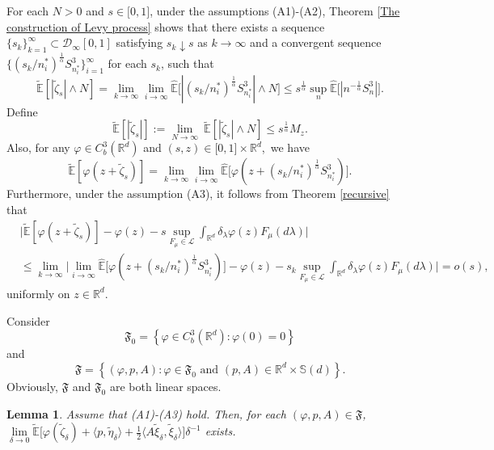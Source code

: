 \documentclass[a4paper,oneside,10pt]{article}%
\newtheorem{lemma}[theorem]{Lemma}
\numberwithin{equation}{section}
\begin{document}
For each $N>0$ and $s\in \lbrack0,1]$, under the assumptions (A1)-(A2), Theorem
\ref{The construction of Levy process} shows that there exists a sequence
$\{s_{k}\}_{k=1}^{\infty}\subset \mathcal{D}_{\infty}[0,1]$ satisfying
$s_{k}\downarrow s$ as $k\rightarrow \infty$ and a convergent sequence
$\big \{(s_{k}/n_{i}^{\ast})^{\frac{1}{\alpha}}S_{n_{i}^{\ast}}^{3}%
\big \}_{i=1}^{\infty}$ for each $s_{k}$, such that
\[
\mathbb{\tilde{E}}[|\tilde{\zeta}_{s}|\wedge N]=\lim_{k\rightarrow \infty}%
\lim_{i\rightarrow \infty}\mathbb{\hat{E}}\big[|(s_{k}/n_{i}^{\ast})^{\frac
{1}{\alpha}}S_{n_{i}^{\ast}}^{3}|\wedge N\big]\leq s^{\frac{1}{\alpha}}%
\sup \limits_{n}\mathbb{\hat{E}}\big[|n^{-\frac{1}{\alpha}}S_{n}^{3}|\big].
\]
Define
\begin{equation}
\mathbb{\tilde{E}}[|\tilde{\zeta}_{s}|]:=\lim_{N\rightarrow \infty
}\mathbb{\  \tilde{E}}[|\tilde{\zeta}_{s}|\wedge N]\leq s^{\frac{1}{\alpha}%
}M_{z}. \label{Z moment}%
\end{equation}
Also, for any $\varphi \in C_{b}^{3}(\mathbb{R}^{d})$ and $(s,z)\in
\lbrack0,1]\times \mathbb{R}^{d}$,\ we have
\[
\mathbb{\tilde{E}}[\varphi(z+\tilde{\zeta}_{s})]=\lim_{k\rightarrow \infty}%
\lim_{i\rightarrow \infty}\mathbb{\hat{E}}\big[\varphi(z+(s_{k}/n_{i}^{\ast
})^{\frac{1}{\alpha}}S_{n_{i}^{\ast}}^{3})\big].
\]
Furthermore, under the assumption (A3), it follows from Theorem
\ref{recursive} that
\begin{align}
&  \bigg \vert \mathbb{\tilde{E}}[\varphi(z+\tilde{\zeta}_{s})]-\varphi
(z)-s\sup \limits_{F_{\mu}\in \mathcal{L}}\int_{\mathbb{R}^{d}}\delta_{\lambda
}\varphi(z)F_{\mu}(d\lambda)\bigg \vert \label{Z condition}\\
&  \leq \lim_{k\rightarrow \infty}\bigg \vert \lim_{i\rightarrow \infty
}\mathbb{\hat{E}}\big[\varphi(z+(s_{k}/n_{i}^{\ast})^{\frac{1}{\alpha}%
}S_{n_{i}^{\ast}}^{3})\big]-\varphi(z)-s_{k}\sup \limits_{F_{\mu}\in
\mathcal{L}}\int_{\mathbb{R}^{d}}\delta_{\lambda}\varphi(z)F_{\mu}%
(d\lambda)\bigg \vert=o(s),\nonumber
\end{align}
uniformly on $z\in \mathbb{R}^{d}$.

Consider
\[
\mathfrak{F}_{0}=\left \{  \varphi \in C_{b}^{3}(\mathbb{R}^{d}):\varphi
(0)=0\right \}
\]
and
\[
\mathfrak{F}=\left \{  (\varphi,p,A):\varphi \in \mathfrak{F}_{0}\text{ and }
(p,A)\in \mathbb{R}^{d}\times \mathbb{S}(d)\right \}  .
\]
Obviously, $\mathfrak{F}$ and $\mathfrak{F}_{0}$ are both linear spaces.

\begin{lemma}
\label{exist theorem}Assume that (A1)-(A3) hold. Then, for each $(\varphi
,p,A)\in \mathfrak{F}$, $\lim \limits_{\delta \rightarrow0}\mathbb{\tilde{E}}
\big[\varphi(\tilde{\zeta}_{\delta})+\langle p,\tilde{\eta} _{\delta}\rangle+
\frac{1}{2}\langle A\tilde{\xi}_{\delta},\tilde{\xi}_{\delta}\rangle
\big]\delta^{-1}$ exists.
\end{lemma}
\end{document}
